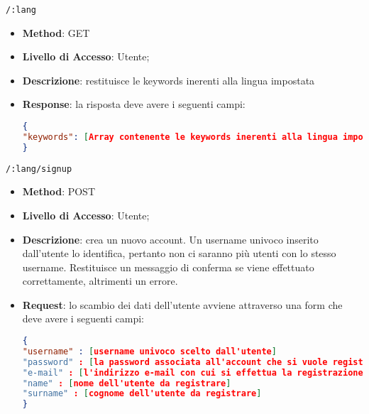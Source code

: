 	\item \texttt{/:lang}
		\begin{itemize}
			\item \textbf{Method}: GET
			\item \textbf{Livello di Accesso}: Utente;
			\item \textbf{Descrizione}: restituisce le keywords inerenti alla lingua impostata
			\item \textbf{Response}: la risposta deve avere i seguenti campi:
\begin{lstlisting}[language=json,firstnumber=1]
{
"keywords": [Array contenente le keywords inerenti alla lingua impostata ]
}
\end{lstlisting}
		\end{itemize}
	
	
	\item \texttt{/:lang/signup}
		\begin{itemize}
			\item \textbf{Method}: POST
			\item \textbf{Livello di Accesso}: Utente;
			\item \textbf{Descrizione}: crea un nuovo account. Un username univoco inserito dall'utente lo identifica, pertanto non ci saranno più utenti con lo stesso username. Restituisce un messaggio di conferma se viene effettuato correttamente, altrimenti un errore.
			\item \textbf{Request}: lo scambio dei dati dell'utente avviene attraverso una form che deve avere i seguenti campi:
\begin{lstlisting}[language=json,firstnumber=1]
{
"username" : [username univoco scelto dall'utente]
"password" : [la password associata all'account che si vuole registrare]
"e-mail" : [l'indirizzo e-mail con cui si effettua la registrazione]
"name" : [nome dell'utente da registrare]
"surname" : [cognome dell'utente da registrare]
}
\end{lstlisting}
		\end{itemize}